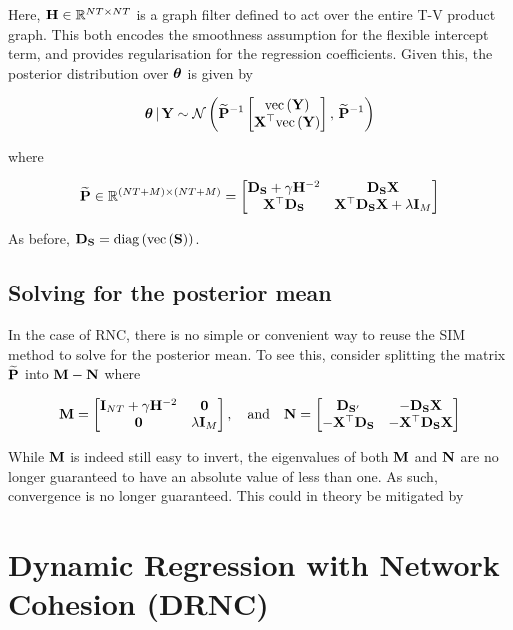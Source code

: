 Here, $\mathbf{H} \in \mathbb{R}^{NT \times NT}$ is a graph filter defined to act over the entire T-V product graph. This both encodes the smoothness assumption for the flexible intercept term, and provides regularisation for the regression coefficients. Given this, the posterior distribution over $\boldsymbol{\theta}$ is given by 

\begin{equation}
    \boldsymbol{\theta} \, | \, \mathbf{Y} \sim \mathcal{N}\left(\widetilde{\mathbf{P}}^{-1} \begin{bmatrix} \text{\textup{vec}}\left(\mathbf{Y}\right) \\ \mathbf{X}^\top \text{\textup{vec}}\left(\mathbf{Y}\right) \end{bmatrix}, \, \widetilde{\mathbf{P}}^{-1}\right)
\end{equation}

where 

\begin{equation}
    \widetilde{\mathbf{P}} \in \mathbb{R}^{(NT + M) \times (NT + M)}= 
    \begin{bmatrix}
     \mathbf{D}_{\mathbf{S}} + \gamma \mathbf{H}^{-2} & \mathbf{D}_{\mathbf{S}}  \mathbf{X} \\
     \mathbf{X}^\top \mathbf{D}_{\mathbf{S}} & \mathbf{X}^\top \mathbf{D}_{\mathbf{S}} \mathbf{X} + \lambda \mathbf{I}_M   
    \end{bmatrix}
\end{equation}


As before, $\mathbf{D}_{\mathbf{S}} = \text{\textup{diag}}\left(\text{\textup{vec}}\left(\mathbf{S}\right)\right)$. 

\subsection{Solving for the posterior mean}

In the case of RNC, there is no simple or convenient way to reuse the SIM method to solve for the posterior mean. To see this, consider splitting the matrix $\widetilde{\mathbf{P}}$ into $\mathbf{M} - \mathbf{N}$ where 

\begin{equation*}
    \mathbf{M} = 
    \begin{bmatrix}
        \mathbf{I}_{NT} + \gamma \mathbf{H}^{-2} & \mathbf{0} \\
        \mathbf{0} & \lambda \mathbf{I}_M   
       \end{bmatrix}, 
       \quad \text{and} \quad \mathbf{N} = \begin{bmatrix}
        \mathbf{D}_{\mathbf{S}'} & -\mathbf{D}_{\mathbf{S}}  \mathbf{X} \\
        -\mathbf{X}^\top \mathbf{D}_{\mathbf{S}} & -\mathbf{X}^\top\mathbf{D}_{\mathbf{S}} \mathbf{X} 
       \end{bmatrix}
\end{equation*}

While $\mathbf{M}$ is indeed still easy to invert, the eigenvalues of both $\mathbf{M}$ and $\mathbf{N}$ are no longer guaranteed to have an absolute value of less than one. As such, convergence is no longer guaranteed. This could in theory be mitigated by 

\section{Dynamic Regression with Network Cohesion (DRNC)}